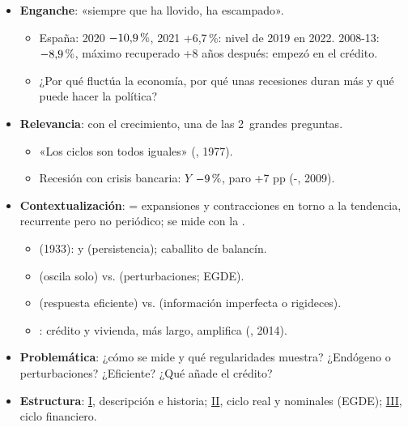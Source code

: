 \documentclass{article}
\begin{document}
\cabecerarepaso
\begin{columnas}

\begin{itemize}
\item \textbf{Enganche}: «siempre que ha llovido, ha escampado».
  \begin{itemize}
  \item España: 2020 $-10{,}9\mbox{\,\%}$, 2021 +6,7\,\%: nivel de 2019 en 2022. 2008-13: $-8{,}9\mbox{\,\%}$, máximo recuperado +8 años después: empezó en el crédito.
  \item ¿Por qué fluctúa la economía, por qué unas recesiones duran más y qué puede hacer la política?
  \end{itemize}
\item \textbf{Relevancia}: con el crecimiento, una de las 2~grandes preguntas.
  \begin{itemize}
  \item «Los ciclos son todos iguales» (, 1977).
  \item Recesión con crisis bancaria: $Y$ $-9\mbox{\,\%}$, paro +7 pp (-, 2009).
  \end{itemize}
\item \textbf{Contextualización}:  = expansiones y contracciones en torno a la tendencia, recurrente pero no periódico; se mide con la .
  \begin{itemize}
  \item {} (1933):  y  (persistencia); caballito de balancín.
  \item {} (oscila solo) vs.  (perturbaciones; EGDE).
  \item {} (respuesta eficiente) vs.  (información imperfecta o rigideces).
  \item {}: crédito y vivienda, más largo, amplifica (, 2014).
  \end{itemize}
\item \textbf{Problemática}: ¿cómo se mide y qué regularidades muestra? ¿Endógeno o perturbaciones? ¿Eficiente? ¿Qué añade el crédito?
\item \textbf{Estructura}: \hyperref[rep:I]{I}, descripción e historia; \hyperref[rep:II]{II}, ciclo real y nominales (EGDE); \hyperref[rep:III]{III}, ciclo financiero.
\end{itemize}


\end{columnas}
\end{document}
